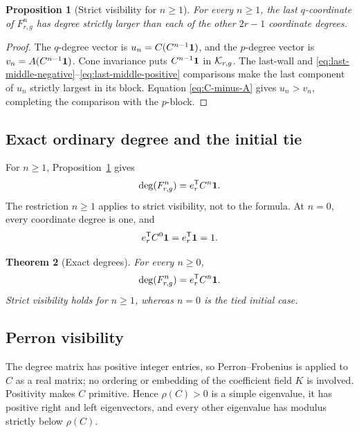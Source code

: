 \documentclass[11pt]{article}
\newtheorem{theorem}{Theorem}[section]
\newtheorem{proposition}[theorem]{Proposition}
\theoremstyle{remark}
\numberwithin{equation}{section}
\begin{document}
\begin{proposition}[Strict visibility for \(n\geq1\)]\label{prop:visibility}
For every \(n\geq1\), the last \(q\)-coordinate of \(F_{r,g}^n\) has
degree strictly larger than each of the other \(2r-1\) coordinate degrees.
\end{proposition}

\begin{proof}
The \(q\)-degree vector is \(u_n=C(C^{n-1}\mathbf{1})\), and the \(p\)-degree
vector is \(v_n=A(C^{n-1}\mathbf{1})\).  Cone invariance puts
\(C^{n-1}\mathbf{1}\) in \(\mathcal{K}_{r,g}\).  The last-wall and
\eqref{eq:last-middle-negative}--\eqref{eq:last-middle-positive} comparisons
make the last component of \(u_n\) strictly largest in its block.
Equation \eqref{eq:C-minus-A} gives \(u_n>v_n\), completing the comparison
with the \(p\)-block.
\end{proof}

\subsection{Exact ordinary degree and the initial tie}

For \(n\geq1\), Proposition~\ref{prop:visibility} gives
\begin{equation}\label{eq:degree-positive}
\operatorname{deg}(F_{r,g}^n)=e_r^{\mathsf{T}}C^n\mathbf{1}.
\end{equation}
The restriction \(n\geq1\) applies to strict visibility, not to the formula.
At \(n=0\), every coordinate degree is one, and
\[
e_r^{\mathsf{T}}C^0\mathbf{1}=e_r^{\mathsf{T}}\mathbf{1}=1.
\]

\begin{theorem}[Exact degrees]\label{thm:exact-degree}
For every \(n\geq0\),
\begin{equation}\label{eq:exact-degree}
\operatorname{deg}(F_{r,g}^n)=e_r^{\mathsf{T}}C^n\mathbf{1}.
\end{equation}
Strict visibility holds for \(n\geq1\), whereas \(n=0\) is the tied
initial case.
\end{theorem}

\subsection{Perron visibility}

The degree matrix has positive integer entries, so Perron--Frobenius is
applied to \(C\) as a real matrix; no ordering or embedding of the
coefficient field \(K\) is involved.  Positivity makes \(C\) primitive.
Hence \(\rho(C)>0\) is a simple eigenvalue, it has positive right and left
eigenvectors, and every other eigenvalue has modulus strictly below
\(\rho(C)\).
\end{document}
